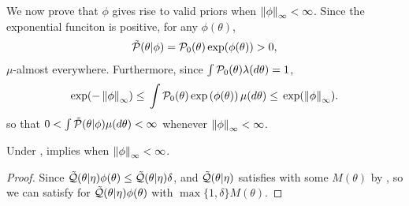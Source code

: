 We now prove that $\phi$ gives rise to valid priors when $\left\Vert\phi\right\Vert_{\infty} <
\infty$. Since the exponential funciton is positive, for any $\phi(\theta)$,
%
\begin{align*}
%
\ptil(\theta \vert \phi) = \pbase(\theta) \exp(\phi(\theta)) > 0,
%
\end{align*}
%
$\mu$-almost everywhere.  Furthermore, since $\int \mathcal{P}_{0}(\theta)
\lambda(d\theta) = 1$,
%
\begin{align*}
%
\exp(-\norminf{\phi}) \le{}
\int \pbase(\theta) \exp\left(\phi(\theta)\right) \mu(d\theta)
\le{}
\exp(\norminf{\phi}).
%
\end{align*}
%
so that $0 < \int \tilde{\mathcal{P}}(\theta \vert \phi) \mu(d\theta) < \infty$
whenever $\left\Vert\phi\right\Vert_{\infty} < \infty$.
%

\vspace{1em}

\begin{lem}
%
Under ,
 implies  when
$\left\Vert\phi\right\Vert_{\infty} < \infty$.

\begin{proof}
%
Since $\tilde{\mathcal{Q}}(\theta \vert \eta) \phi(\theta) \le \tilde{\mathcal{Q}}(\theta \vert \eta)
\delta$, and $\tilde{\mathcal{Q}}(\theta \vert \eta)$ satisfies  with
some $M(\theta)$ by , so we can satisfy
 for $\tilde{\mathcal{Q}}(\theta \vert \eta) \phi(\theta)$ with
$\max\{1, \delta\} M(\theta)$.
%
\end{proof}
%
\end{lem}

